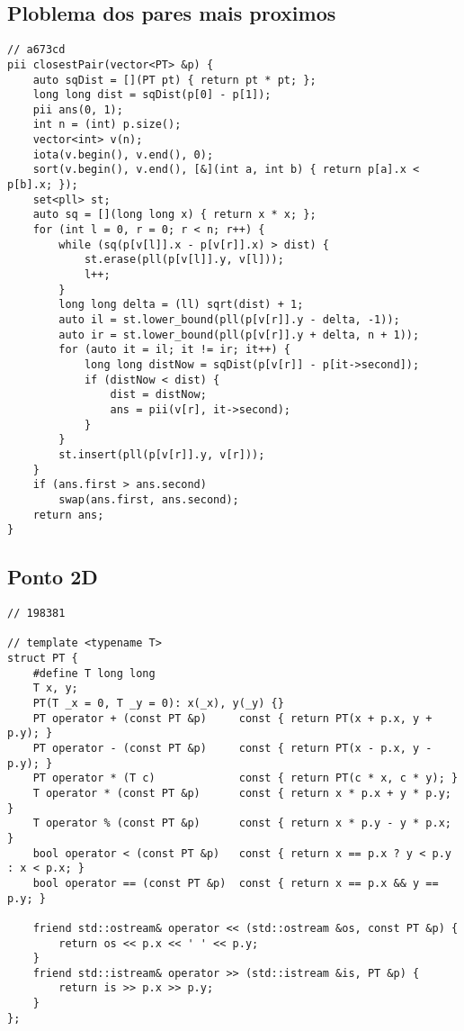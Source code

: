 \documentclass[12pt, a4paper, twoside]{article}
\begin{document}
\subsection{Ploblema dos pares mais proximos
}
\begin{lstlisting}
// a673cd
pii closestPair(vector<PT> &p) {
	auto sqDist = [](PT pt) { return pt * pt; };
	long long dist = sqDist(p[0] - p[1]);
	pii ans(0, 1);
	int n = (int) p.size();
	vector<int> v(n);
	iota(v.begin(), v.end(), 0);
	sort(v.begin(), v.end(), [&](int a, int b) { return p[a].x < p[b].x; });
	set<pll> st;
	auto sq = [](long long x) { return x * x; };
	for (int l = 0, r = 0; r < n; r++) {
		while (sq(p[v[l]].x - p[v[r]].x) > dist) {
			st.erase(pll(p[v[l]].y, v[l]));
			l++;
		}
		long long delta = (ll) sqrt(dist) + 1;
		auto il = st.lower_bound(pll(p[v[r]].y - delta, -1));
		auto ir = st.lower_bound(pll(p[v[r]].y + delta, n + 1));
		for (auto it = il; it != ir; it++) {
			long long distNow = sqDist(p[v[r]] - p[it->second]);
			if (distNow < dist) {
				dist = distNow;
				ans = pii(v[r], it->second);
			}
		}
		st.insert(pll(p[v[r]].y, v[r]));
	}
	if (ans.first > ans.second)
		swap(ans.first, ans.second);
	return ans;
}
\end{lstlisting}

\subsection{Ponto 2D
}
\begin{lstlisting}
// 198381

// template <typename T>
struct PT {
	#define T long long
	T x, y;
	PT(T _x = 0, T _y = 0): x(_x), y(_y) {}
	PT operator + (const PT &p)		const { return PT(x + p.x, y + p.y); }
	PT operator - (const PT &p) 	const { return PT(x - p.x, y - p.y); }
	PT operator * (T c)				const { return PT(c * x, c * y); }
	T operator * (const PT &p) 		const { return x * p.x + y * p.y; }
	T operator % (const PT &p) 		const { return x * p.y - y * p.x; }
	bool operator < (const PT &p) 	const { return x == p.x ? y < p.y : x < p.x; }
	bool operator == (const PT &p) 	const { return x == p.x && y == p.y; }

	friend std::ostream& operator << (std::ostream &os, const PT &p) {
		return os << p.x << ' ' << p.y;
	}
	friend std::istream& operator >> (std::istream &is, PT &p) {
		return is >> p.x >> p.y;
	}
};
\end{lstlisting}



%
%
\end{document}
